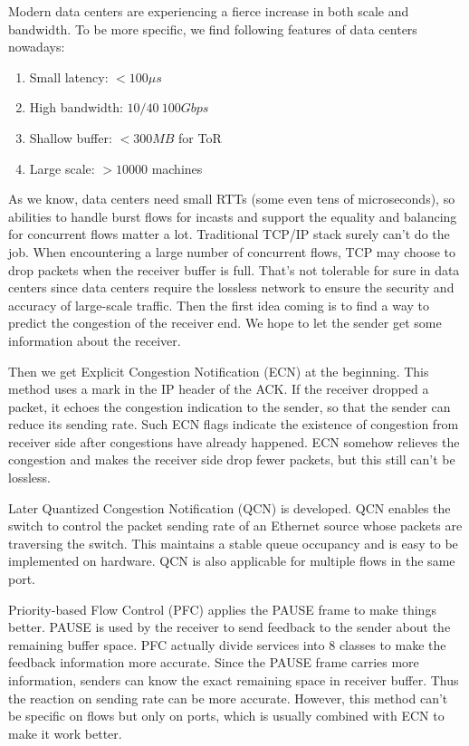 \documentclass[12pt,a4paper]{article}
\begin{document}
Modern data centers are experiencing a fierce increase in both scale and bandwidth.
To be more specific, we find following features of data centers nowadays:
\begin{enumerate}
	\item Small latency: $<100\mu s$
	\item High bandwidth: $10/40~100Gbps$
	\item Shallow buffer: $<300MB$ for ToR
	\item Large scale: $>10000$ machines
\end{enumerate}
As we know, data centers need small RTTs (some even tens of microseconds),
so abilities to handle burst flows for incasts and support the equality and balancing for concurrent flows matter a lot.
Traditional TCP/IP stack surely can't do the job.
When encountering a large number of concurrent flows, TCP may choose to drop packets when the receiver buffer is full.
That's not tolerable for sure in data centers since data centers require the lossless network to ensure the security and accuracy of large-scale traffic.
Then the first idea coming is to find a way to predict the congestion of the receiver end.
We hope to let the sender get some information about the receiver.

Then we get Explicit Congestion Notification (ECN) \cite{ECN} at the beginning.
This method uses a mark in the IP header of the ACK.
If the receiver dropped a packet, it echoes the congestion indication to the sender, so that the sender can reduce its sending rate.
Such ECN flags indicate the existence of congestion from receiver side after congestions have already happened.
ECN somehow relieves the congestion and makes the receiver side drop fewer packets, but this still can't be lossless.

Later Quantized Congestion Notification (QCN) \cite{QCN} is developed.
QCN enables the switch to control the packet sending rate of an Ethernet source whose packets are traversing the switch.
This maintains a stable queue occupancy and is easy to be implemented on hardware.
QCN is also applicable for multiple flows in the same port.

Priority-based Flow Control (PFC) \cite{PFC} applies the PAUSE frame to make things better.
PAUSE is used by the receiver to send feedback to the sender about the remaining buffer space.
PFC actually divide services into 8 classes to make the feedback information more accurate.
Since the PAUSE frame carries more information, senders can know the exact remaining space in receiver buffer.
Thus the reaction on sending rate can be more accurate.
However, this method can't be specific on flows but only on ports, which is usually combined with ECN to make it work better.
\end{document}
